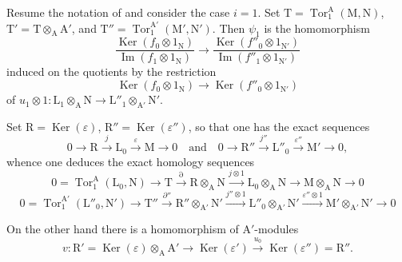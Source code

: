 \begin{env}[11.2.3]
\label{IV.11.2.3}
Resume the notation of  and consider the case $i=1$.
Set
$\mathrm{T}=\operatorname{Tor}_1^\mathrm{A}(\mathrm{M},\mathrm{N})$,
$\mathrm{T}'=\mathrm{T}\otimes_\mathrm{A}\mathrm{A}'$, and
$\mathrm{T}''=\operatorname{Tor}_1^{\mathrm{A}'}
(\mathrm{M}',\mathrm{N}')$. Then $\psi_1$ is the homomorphism
\[
  \frac{\operatorname{Ker}(f_0\otimes1_\mathrm{N})}
       {\operatorname{Im}(f_1\otimes1_\mathrm{N})}
  \longrightarrow
  \frac{\operatorname{Ker}(f''_0\otimes1_{\mathrm{N}'})}
       {\operatorname{Im}(f''_1\otimes1_{\mathrm{N}'})}
\]
induced on the quotients by the restriction
\[
  \operatorname{Ker}(f_0\otimes1_\mathrm{N})
  \longrightarrow
  \operatorname{Ker}(f''_0\otimes1_{\mathrm{N}'})
\]
of
$u_1\otimes1:\mathrm{L}_1\otimes_\mathrm{A}\mathrm{N}\to
\mathrm{L}''_1\otimes_{\mathrm{A}'}\mathrm{N}'$.

Set $\mathrm{R}=\operatorname{Ker}(\varepsilon)$, $\mathrm{R}''=\operatorname{Ker}(\varepsilon'')$, so that one has the exact sequences
\begin{equation}
  0\longrightarrow\mathrm{R}\xrightarrow{j}\mathrm{L}_0\xrightarrow{\varepsilon}\mathrm{M}\longrightarrow 0
  \quad\text{and}\quad
  0\longrightarrow\mathrm{R}''\xrightarrow{j''}\mathrm{L}''_0\xrightarrow{\varepsilon''}\mathrm{M}'\longrightarrow 0,
\end{equation}
whence one deduces the exact homology sequences
\begin{equation}
  0=\operatorname{Tor}_1^\mathrm{A}(\mathrm{L}_0,\mathrm{N})\to\mathrm{T}\xrightarrow{\partial}\mathrm{R}\otimes_\mathrm{A}\mathrm{N}\xrightarrow{j\otimes 1}\mathrm{L}_0\otimes_\mathrm{A}\mathrm{N}\to\mathrm{M}\otimes_\mathrm{A}\mathrm{N}\to 0
  \label{IV.11.2.3.1}
\tag{11.2.3.1}
\end{equation}
\begin{equation}
  0=\operatorname{Tor}_1^{\mathrm{A}'}(\mathrm{L}''_0,\mathrm{N}')\to\mathrm{T}''\xrightarrow{\partial''}\mathrm{R}''\otimes_{\mathrm{A}'}\mathrm{N}'\xrightarrow{j''\otimes 1}\mathrm{L}''_0\otimes_{\mathrm{A}'}\mathrm{N}'\xrightarrow{\varepsilon''\otimes 1}\mathrm{M}'\otimes_{\mathrm{A}'}\mathrm{N}'\to 0
  \label{IV.11.2.3.2}
\tag{11.2.3.2}
\end{equation}

On the other hand there is a homomorphism of $\mathrm{A}'$-modules
\[
  v:\mathrm{R}'=\operatorname{Ker}(\varepsilon)\otimes_\mathrm{A}\mathrm{A}'\longrightarrow\operatorname{Ker}(\varepsilon')\xrightarrow{u_0}\operatorname{Ker}(\varepsilon'')=\mathrm{R}''.
\]
\end{env}

